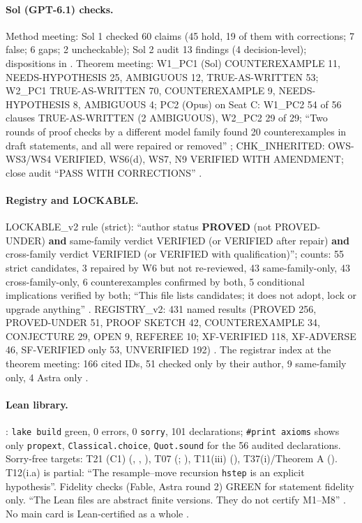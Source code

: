\paragraph{Sol (GPT-6.1) checks.} Method meeting: Sol 1 checked 60 claims (45 hold, 19 of them with corrections; 7 false; 6 gaps; 2 uncheckable); Sol 2 audit 13 findings (4 decision-level); dispositions in . Theorem meeting: W1\_PC1 (Sol) COUNTEREXAMPLE 11, NEEDS-HYPOTHESIS 25, AMBIGUOUS 12, TRUE-AS-WRITTEN 53; W2\_PC1 TRUE-AS-WRITTEN 70, COUNTEREXAMPLE 9, NEEDS-HYPOTHESIS 8, AMBIGUOUS 4; PC2 (Opus) on Seat C: W1\_PC2 54 of 56 clauses TRUE-AS-WRITTEN (2 AMBIGUOUS), W2\_PC2 29 of 29; ``Two rounds of proof checks by a different model family found 20 counterexamples in draft statements, and all were repaired or removed'' ; CHK\_INHERITED: OWS-WS3/WS4 VERIFIED, WS6(d), WS7, N9 VERIFIED WITH AMENDMENT; close audit ``PASS WITH CORRECTIONS'' .

\paragraph{Registry and LOCKABLE.} LOCKABLE\_v2 rule (strict): ``author status \textbf{PROVED} (not PROVED-UNDER) \textbf{and} same-family verdict VERIFIED (or VERIFIED after repair) \textbf{and} cross-family verdict VERIFIED (or VERIFIED with qualification)''; counts: 55 strict candidates, 3 repaired by W6 but not re-reviewed, 43 same-family-only, 43 cross-family-only, 6 counterexamples confirmed by both, 5 conditional implications verified by both; ``This file lists candidates; it does not adopt, lock or upgrade anything'' . REGISTRY\_v2: 431 named results (PROVED 256, PROVED-UNDER 51, PROOF SKETCH 42, COUNTEREXAMPLE 34, CONJECTURE 29, OPEN 9, REFEREE 10; XF-VERIFIED 118, XF-ADVERSE 46, SF-VERIFIED only 53, UNVERIFIED 192) . The registrar index at the theorem meeting: 166 cited IDs, 51 checked only by their author, 9 same-family only, 4 Astra only .

\paragraph{Lean library.} : \texttt{lake build} green, 0 errors, 0 \texttt{sorry}, 101 declarations; \texttt{\#print axioms} shows only \texttt{propext}, \texttt{Classical.choice}, \texttt{Quot.sound} for the 56 audited declarations. Sorry-free targets: T21 (C1) (, , ), T07 (; ), T11(iii) (), T37(i)/Theorem A (). T12(i.a) is partial: ``The resample--move recursion \texttt{hstep} is an explicit hypothesis''. Fidelity checks (Fable, Astra round 2) GREEN for statement fidelity only. ``The Lean files are abstract finite versions. They do not certify M1--M8'' . No main card is Lean-certified as a whole .

